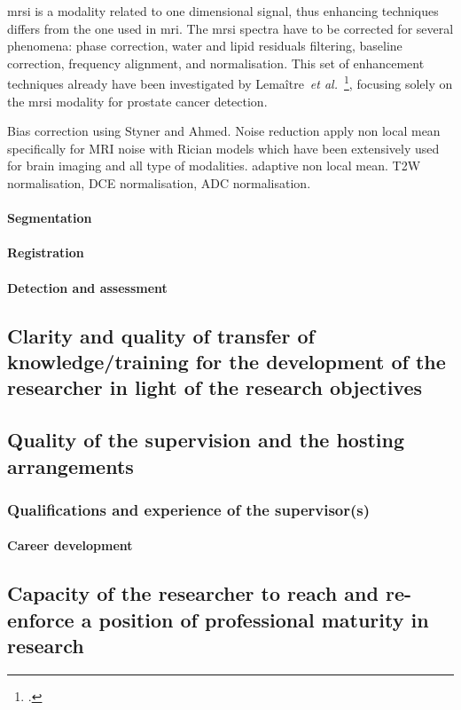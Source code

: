 \ac{mrsi} is a modality related to one dimensional signal, thus enhancing techniques differs from the one used in \ac{mri}.
The \ac{mrsi} spectra have to be corrected for several phenomena: phase correction, water and lipid residuals filtering, baseline correction, frequency alignment, and normalisation.
This set of enhancement techniques already have been investigated by Lema\^itre~\emph{et al.}~\footcite{Lemaitre2011}, focusing solely on the \ac{mrsi} modality for prostate cancer detection.




Bias correction using Styner and Ahmed.
Noise reduction apply non local mean specifically for MRI noise with Rician models which have been extensively used for brain imaging and all type of modalities. adaptive non local mean.
T2W normalisation, DCE normalisation, ADC normalisation.

\paragraph{Segmentation}

\paragraph{Registration}

\paragraph{Detection and assessment}

\subsection{Clarity and quality of transfer of knowledge/training for the development of the researcher in light of the research objectives}
\label{sec:transfer}


\subsection{Quality of the supervision and the hosting arrangements}
\label{sec:supervision}

\subsubsection*{Qualifications and experience of the supervisor(s)}


\paragraph{Career development}

\subsection{Capacity of the researcher to reach and re-enforce a position of professional maturity in research}
\label{sec:maturity}
